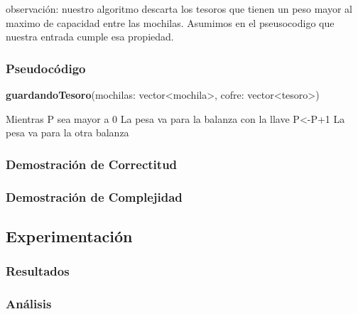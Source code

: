 \documentclass[spanish,12pt]{article}
\begin{document}
observación: nuestro algoritmo descarta los tesoros que tienen un peso mayor al maximo de capacidad entre las mochilas. Asumimos en el pseusocodigo que nuestra entrada cumple esa propiedad.

\subsubsection{Pseudocódigo}

\begin{algorithm}[H]{\textbf{guardandoTesoro}(mochilas: vector<mochila>, cofre: vector<tesoro>)}
	\begin{algorithmic}[1]
		\State Mientras P sea mayor a 0
    			La pesa va para la balanza con la llave
    			P<-P+1
    			La pesa va para  la otra  balanza
	\end{algorithmic}
\end{algorithm}



\subsubsection{Demostración de Correctitud}


\subsubsection{Demostración de Complejidad}

\subsection{Experimentación}

\subsubsection{Resultados}

\subsubsection{Análisis}


\end{document}
